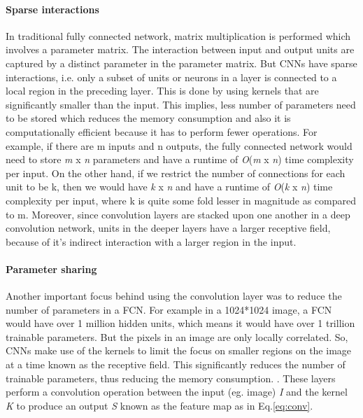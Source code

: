 \paragraph{Sparse interactions}
In traditional fully connected network, matrix multiplication is performed which involves a parameter matrix. The interaction between input and output units are captured by a distinct parameter in the parameter matrix. But \ac{CNN}s have sparse interactions, i.e. only a subset of units or neurons in a layer is connected to a local region in the preceding layer. This is done by using kernels that are significantly smaller than the input. This implies, less number of parameters need to be stored which reduces the memory consumption and also it is computationally efficient because it has to perform fewer operations. For example, if there are m inputs and n outputs, the fully connected network would need to store \textit{m} x \textit{n} parameters and have a runtime of \textit{O}(\textit{m} x \textit{n}) time complexity per input. On the other hand, if we restrict the number of connections for each unit to be k, then we would have \textit{k} x \textit{n} and have a runtime of \textit{O}(\textit{k} x \textit{n}) time complexity per input, where k is quite some fold lesser in magnitude as compared to m. Moreover, since convolution layers are stacked upon one another in a deep convolution network, units in the deeper layers have a larger receptive field, because of it's indirect interaction with a larger region in the input.
\paragraph{Parameter sharing}
Another important focus behind using the convolution layer was to reduce the number of parameters in a \ac{FCN}. For example in a 1024*1024 image, a \ac{FCN} would have over 1 million hidden units, which means it would have over 1 trillion trainable parameters. But the pixels in an image are only locally correlated. So, \ac{CNN}s make use of the kernels to limit the focus on smaller regions on the image at a time known as the receptive field. This significantly reduces the number of trainable parameters, thus reducing the memory consumption. \cite{ConvNet}.    These layers perform a convolution operation between the input (eg. image) \textit{I} and the kernel \textit{K} to produce an output \textit{S} known as the feature map as in Eq.\ref{eq:conv}.
